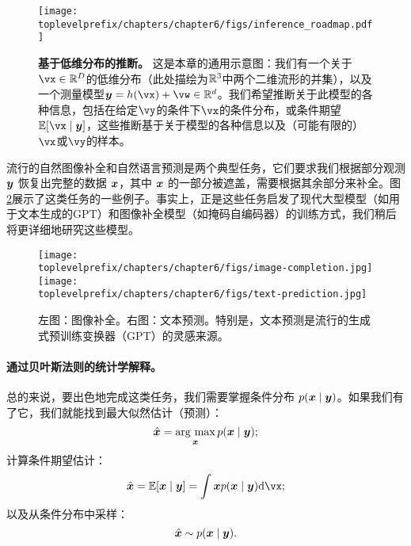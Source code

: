 \documentclass[../../book-main_zh.tex]{subfiles}
\begin{document}
\begin{figure}
  \centering 
  \texttt{[image: \\toplevelprefix/chapters/chapter6/figs/inference\_roadmap.pdf]}
  \caption{\small \textbf{基于低维分布的推断。} 这是本章的通用示意图：我们有一个关于\(\vx \in \R^{D}\)的低维分布（此处描绘为\(\mathbb{R}^{3}\)中两个二维流形的并集），以及一个测量模型\(\y = h(\vx) + \vw \in \R^{d}\)。我们希望推断关于此模型的各种信息，包括在给定\(\vy\)的条件下\(\vx\)的条件分布，或条件期望\(\mathbb{E}[\vx \mid \y]\)，这些推断基于关于模型的各种信息以及（可能有限的）\(\vx\)或\(\vy\)的样本。}
  \label{fig:inference_roadmap}
\end{figure}

\begin{example}[图像补全与文本预测]
流行的自然图像补全和自然语言预测是两个典型任务，它们要求我们根据部分观测 $\bm{y}$ 恢复出完整的数据 $\bm{x}$，其中 $\bm{x}$ 的一部分被遮盖，需要根据其余部分来补全。图\ref{fig:image-text-completion}展示了这类任务的一些例子。事实上，正是这些任务启发了现代大型模型（如用于文本生成的GPT）和图像补全模型（如掩码自编码器）的训练方式，我们稍后将更详细地研究这些模型。
    \begin{figure}
        \centering
        \texttt{[image: \\toplevelprefix/chapters/chapter6/figs/image-completion.jpg]} \hspace{10mm} \texttt{[image: \\toplevelprefix/chapters/chapter6/figs/text-prediction.jpg]}
        \caption{左图：图像补全。右图：文本预测。特别是，文本预测是流行的生成式预训练变换器（GPT）的灵感来源。}
        \label{fig:image-text-completion}
    \end{figure}
\end{example}


\paragraph{通过贝叶斯法则的统计学解释。}
总的来说，要出色地完成这类任务，我们需要掌握条件分布 $p(\bm{x}\mid \bm{y})$。如果我们有了它，我们就能找到最大似然估计（预测）：
\begin{equation}
  \hat{\bm{x}} = \operatorname*{arg\ max}_{\bm{x}} p(\bm{x}\mid \bm{y});
\end{equation}
计算条件期望估计：
\begin{equation}
  \hat{\x} = \mathbb{E}[\x \mid \y] = \int \x p(\x\mid \y)\odif{\vx};
\end{equation}
以及从条件分布中采样：
\begin{equation}
  \hat{\bm{x}} \sim p(\bm{x} \mid \bm{y}).
\end{equation}
\end{document}
